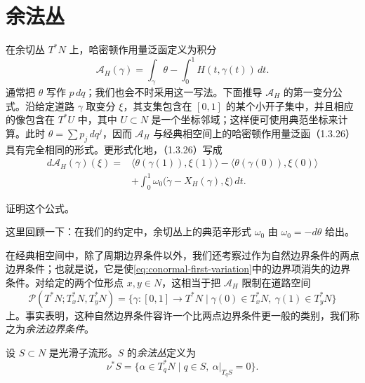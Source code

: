 \section{余法丛}
\label{sec:conormal-bundles}

在余切丛 $T^*N$ 上，哈密顿作用量泛函定义为积分
\[
  \mathcal A_H(\gamma)=\int_\gamma\theta-\int_0^1H(t,\gamma(t))\,dt.
\]
通常把 $\theta$ 写作 $p\,dq$；我们也会不时采用这一写法。下面推导 $\mathcal A_H$ 的第一变分公式。沿给定道路 $\gamma$ 取变分 $\xi$，其支集包含在 $[0,1]$ 的某个小开子集中，并且相应的像包含在 $T^*U$ 中，其中 $U\subset N$ 是一个坐标邻域；这样便可使用典范坐标来计算。此时
$\theta=\sum p_j\,dq^j$，因而 $\mathcal A_H$ 与经典相空间上的哈密顿作用量泛函（1.3.26）具有完全相同的形式。更形式化地，（1.3.26）写成
\begin{equation}
\begin{split}
 d\mathcal A_H(\gamma)(\xi)
  ={}&\langle\theta(\gamma(1)),\xi(1)\rangle
      -\langle\theta(\gamma(0)),\xi(0)\rangle \\
    &+\int_0^1\omega_0\bigl(\dot\gamma-X_H(\gamma),\xi\bigr)\,dt.
\end{split}
\label{eq:conormal-first-variation}
\end{equation}

\begin{exercise}\label{ex:conormal-first-variation}
证明这个公式。
\end{exercise}

这里回顾一下：在我们的约定中，余切丛上的典范辛形式 $\omega_0$ 由 $\omega_0=-d\theta$ 给出。

在经典相空间中，除了周期边界条件以外，我们还考察过作为自然边界条件的两点边界条件；也就是说，它是使\eqref{eq:conormal-first-variation}中的边界项消失的边界条件。对给定的两个位形点 $x,y\in N$，这相当于把 $\mathcal A_H$ 限制在道路空间
\[
 \mathcal P(T^*N;T_x^*N,T_y^*N)
 =\{\gamma:[0,1]\to T^*N\mid
       \gamma(0)\in T_x^*N,\ \gamma(1)\in T_y^*N\}
\]
上。事实表明，这种自然边界条件容许一个比两点边界条件更一般的类别，我们称之为\emph{余法边界条件}。

\begin{definition}[余法丛]\label{def:conormal-bundle}
设 $S\subset N$ 是光滑子流形。$S$ 的\emph{余法丛}定义为
\[
 \nu^*S=\{\alpha\in T_q^*N\mid q\in S,\ \alpha|_{T_qS}=0\}.
\]
\end{definition}


